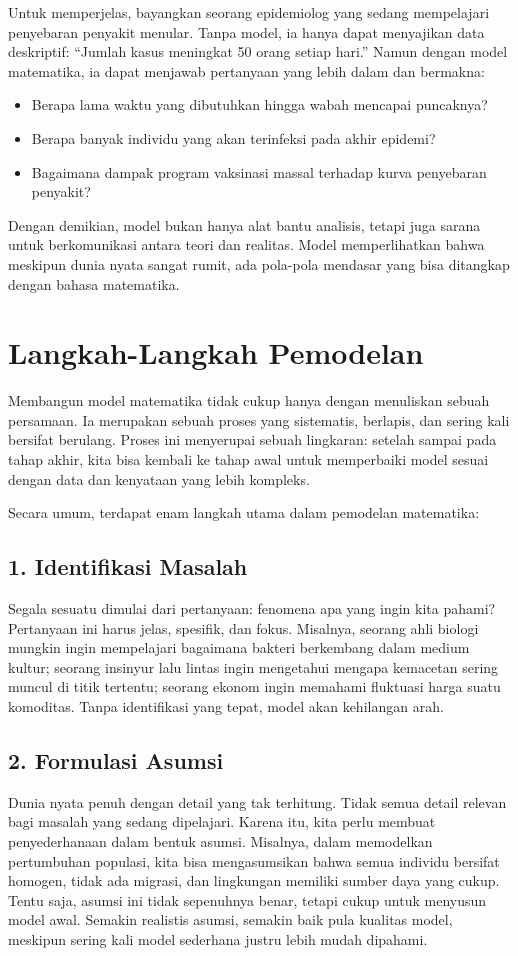 \documentclass{bukumjh}
\begin{document}
Untuk memperjelas, bayangkan seorang epidemiolog yang sedang mempelajari penyebaran penyakit menular. Tanpa model, ia hanya dapat menyajikan data deskriptif: “Jumlah kasus meningkat 50 orang setiap hari.” Namun dengan model matematika, ia dapat menjawab pertanyaan yang lebih dalam dan bermakna:
\begin{itemize}
    \item Berapa lama waktu yang dibutuhkan hingga wabah mencapai puncaknya?
    \item Berapa banyak individu yang akan terinfeksi pada akhir epidemi?
    \item Bagaimana dampak program vaksinasi massal terhadap kurva penyebaran penyakit?
\end{itemize}

Dengan demikian, model bukan hanya alat bantu analisis, tetapi juga sarana untuk berkomunikasi antara teori dan realitas. Model memperlihatkan bahwa meskipun dunia nyata sangat rumit, ada pola-pola mendasar yang bisa ditangkap dengan bahasa matematika.

\section{Langkah-Langkah Pemodelan}

Membangun model matematika tidak cukup hanya dengan menuliskan sebuah persamaan. Ia merupakan sebuah proses yang sistematis, berlapis, dan sering kali bersifat berulang. Proses ini menyerupai sebuah lingkaran: setelah sampai pada tahap akhir, kita bisa kembali ke tahap awal untuk memperbaiki model sesuai dengan data dan kenyataan yang lebih kompleks. 

Secara umum, terdapat enam langkah utama dalam pemodelan matematika:

\subsection*{1. Identifikasi Masalah}
Segala sesuatu dimulai dari pertanyaan: fenomena apa yang ingin kita pahami? Pertanyaan ini harus jelas, spesifik, dan fokus. Misalnya, seorang ahli biologi mungkin ingin mempelajari bagaimana bakteri berkembang dalam medium kultur; seorang insinyur lalu lintas ingin mengetahui mengapa kemacetan sering muncul di titik tertentu; seorang ekonom ingin memahami fluktuasi harga suatu komoditas. Tanpa identifikasi yang tepat, model akan kehilangan arah.

\subsection*{2. Formulasi Asumsi}
Dunia nyata penuh dengan detail yang tak terhitung. Tidak semua detail relevan bagi masalah yang sedang dipelajari. Karena itu, kita perlu membuat penyederhanaan dalam bentuk asumsi. Misalnya, dalam memodelkan pertumbuhan populasi, kita bisa mengasumsikan bahwa semua individu bersifat homogen, tidak ada migrasi, dan lingkungan memiliki sumber daya yang cukup. Tentu saja, asumsi ini tidak sepenuhnya benar, tetapi cukup untuk menyusun model awal. Semakin realistis asumsi, semakin baik pula kualitas model, meskipun sering kali model sederhana justru lebih mudah dipahami.
\end{document}
